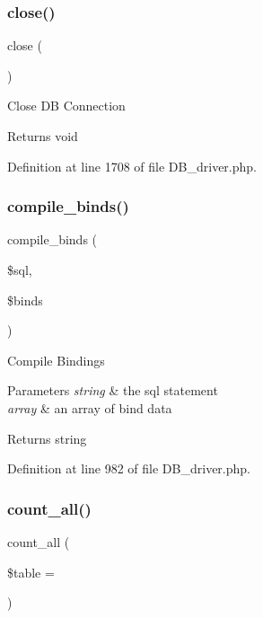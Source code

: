 \subsubsection{\texorpdfstring{close()}{close()}}
{\footnotesize\ttfamily close (\begin{DoxyParamCaption}{ }\end{DoxyParamCaption})}

Close DB Connection

\begin{DoxyReturn}{Returns}
void 
\end{DoxyReturn}


Definition at line 1708 of file D\+B\+\_\+driver.\+php.

\mbox{\label{class_c_i___d_b__driver_a0ba381d2e9078472bd0167e75cc8033c}} 
\subsubsection{\texorpdfstring{compile\_binds()}{compile\_binds()}}
{\footnotesize\ttfamily compile\+\_\+binds (\begin{DoxyParamCaption}\item[{}]{\$sql,  }\item[{}]{\$binds }\end{DoxyParamCaption})}

Compile Bindings


\begin{DoxyParams}{Parameters}
{\em string} & the sql statement \\
\hline
{\em array} & an array of bind data \\
\hline
\end{DoxyParams}
\begin{DoxyReturn}{Returns}
string 
\end{DoxyReturn}


Definition at line 982 of file D\+B\+\_\+driver.\+php.

\mbox{\label{class_c_i___d_b__driver_a7f59c2dc2e3226fe49f35f8c49e8fc94}} 
\subsubsection{\texorpdfstring{count\_all()}{count\_all()}}
{\footnotesize\ttfamily count\+\_\+all (\begin{DoxyParamCaption}\item[{}]{\$table = {\ttfamily \textquotesingle{}\textquotesingle{}} }\end{DoxyParamCaption})}

